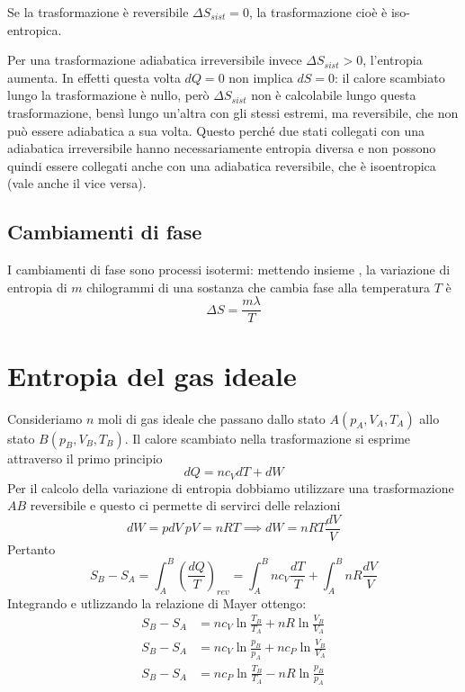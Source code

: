 \documentclass[class=book, crop=false, oneside, 12pt]{standalone}
\begin{document}
Se la trasformazione è reversibile \(\Delta S_{sist} = 0\), la trasformazione cioè è iso-entropica.

Per una trasformazione adiabatica irreversibile invece \(\Delta S_{sist}> 0 \), l'entropia aumenta. 
In effetti questa volta \(d Q =0\) non implica \(d S =0\): il calore scambiato lungo la trasformazione è nullo, però \(\Delta S_{sist}\) non è calcolabile lungo questa trasformazione, bensì lungo un'altra con gli stessi estremi, ma reversibile, che non può essere adiabatica a sua volta. 
Questo perché due stati collegati con una adiabatica irreversibile hanno necessariamente entropia diversa e non possono quindi essere collegati anche con una adiabatica reversibile, che è isoentropica (vale anche il vice versa).

\subsection{Cambiamenti di fase}
I cambiamenti di fase sono processi isotermi: mettendo insieme , la variazione di entropia di \(m\) chilogrammi di una sostanza che cambia fase alla temperatura \(T\) è 
\begin{equation}
    \Delta S = \frac{m \lambda}{T}
\end{equation}

\section{Entropia del gas ideale}

Consideriamo \(n\) moli di gas ideale che passano dallo stato \(A ( p_A , V_A, T_A)\) allo stato \(B ( p_B , V_B, T_B)\). 
Il calore scambiato nella trasformazione si esprime attraverso il primo principio
\begin{equation*}
    d Q = n c_V d T + d W
\end{equation*}
Per il calcolo della variazione di entropia dobbiamo utilizzare una trasformazione \(A B\) reversibile e questo ci permette di servirci delle relazioni
\begin{equation*}
    dW=pdV  \ pV=nRT \implies dW=nRT \frac{dV}{V}
\end{equation*}
Pertanto
\begin{equation}
    S_B - S_A = \int_A^B \left(\frac{d Q}{T}\right)_{rev} = \int_A^B n c_V \frac{d T}{T} + \int_A^B n R \frac{d V}{V}
\end{equation}
Integrando e utlizzando la relazione di Mayer ottengo:
\begin{align}
    S_B - S_A &= n c_V \ln \frac{T_B}{T_A} + n R \ln \frac{V_B}{V_A}\\
    S_B - S_A &= n c_V \ln \frac{p_B}{p_A} + n c_P \ln \frac{V_B}{V_A}\\
    S_B - S_A &= n c_P \ln \frac{T_B}{T_A} - n R \ln \frac{p_B}{p_A}\\
\end{align}
\end{document}
